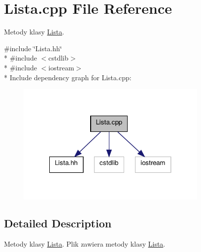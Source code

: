 \hypertarget{a00012}{\section{Lista.\-cpp File Reference}
\label{a00012}
}


Metody klasy \hyperlink{a00004}{Lista}.  


{\ttfamily \#include \char`\"{}Lista.\-hh\char`\"{}}\\*
{\ttfamily \#include $<$cstdlib$>$}\\*
{\ttfamily \#include $<$iostream$>$}\\*
Include dependency graph for Lista.\-cpp\-:\nopagebreak
\begin{figure}[H]
\begin{center}
\leavevmode
\includegraphics[width=264pt]{a00026}
\end{center}
\end{figure}


\subsection{Detailed Description}
Metody klasy \hyperlink{a00004}{Lista}. Plik zawiera metody klasy \hyperlink{a00004}{Lista}. 